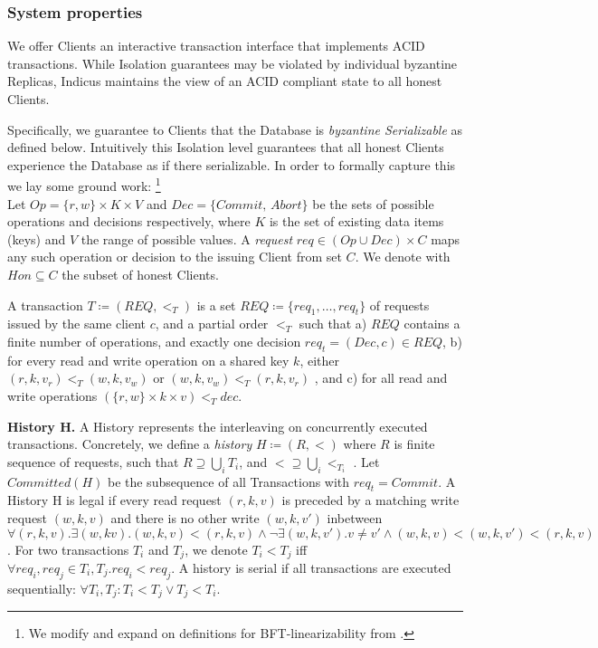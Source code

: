 \subsubsection{System properties}
We offer Clients an interactive transaction interface that implements ACID transactions. While Isolation guarantees may be violated by individual byzantine Replicas, Indicus maintains the view of an ACID compliant state to all honest Clients. 

Specifically, we guarantee to Clients that the Database is \textit{byzantine Serializable} as defined below. Intuitively this Isolation level guarantees that all honest Clients experience the Database as if there serializable. In order to formally capture this we lay some ground work: \footnote{We modify and expand on definitions for BFT-linearizability from \cite{liskov2006tolerating}.} \\

Let $Op =  \{r, w\} \times K \times V $ and $Dec = \{Commit, \,Abort\}$ be the sets of possible operations and decisions respectively, where $K$ is the set of existing data items (keys) and $V$ the range of possible values. A \textit{request} $req \in (Op \cup Dec) \times C$ maps any such operation or decision to the issuing Client from set $C$. We denote with $Hon \subseteq C$ the subset of honest Clients. 

 
A transaction $T \coloneqq (REQ, <_T)$ is a set $REQ \coloneqq \{req_1, \dots, req_t \}$ of requests issued by the same client $c$, and a partial order $<_T$ such that a) $REQ$ contains a finite number of operations, and exactly one decision $req_t = (Dec, c) \in REQ$, b) for every read and write operation on a shared key $k$, either $(r, k, v_r) <_T (w, k, v_w)$ or $(w, k, v_w) <_T (r, k, v_r)$ , and c) for all read and write operations $(\{r,w\} \times k \times v) <_T dec$.

\textbf{History H.} A History represents the interleaving on concurrently executed transactions. Concretely, we define a \textit{history} $H \coloneqq (R, <)$ where $R$ is finite sequence of
requests, such that $R \supseteq \bigcup_i T_i$, and $< \supseteq \bigcup_i <_{T_i}$ .
Let $Committed(H)$ be the subsequence of all Transactions with $req_{t} = Commit$. A History H is legal if every read request $(r, k, v)$ is preceded by a matching write request $(w, k, v)$ and there is no other write $(w, k, v')$ inbetween  $\forall (r, k, v).\exists (w, k v). (w,k,v) < (r,k,v) \land \neg \exists (w, k, v'). v\neq v' \land (w, k,v) < (w,k, v') < (r, k, v)$. For two transactions $T_i$ and $T_j$, we denote $T_i < T_j$ iff $\forall req_i, req_j \in T_i, T_j. req_i < req_j$. A history is serial if all transactions are executed sequentially: $\forall T_i, T_j: T_i < T_j \lor T_j < T_i$.


